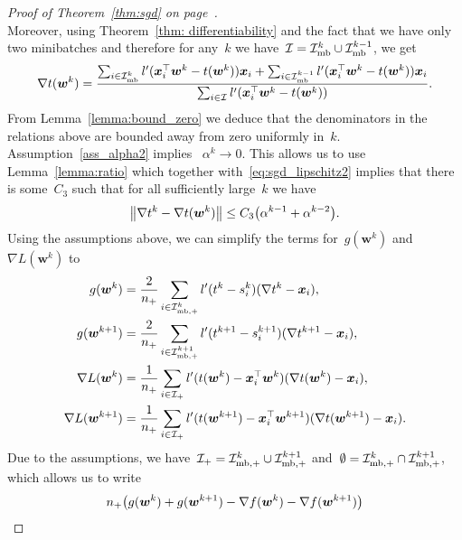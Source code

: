 \begin{proof}[Proof of Theorem~\ref{thm:sgd} on page~\pageref{thm:sgd}]
\begin{equation*}
  \end{equation*}
  Moreover, using Theorem~\ref{thm: differentiability} and the fact that we have only two minibatches and therefore for any~$k$ we have~$\mathcal{I} = \mathcal{I}_{\text{mb}}^k \cup \mathcal{I}_{\text{mb}}^{k-1}$, we get
  \begin{equation*}
    \nabla t(\bm{w}^k)
      = \frac{\sum_{i \in \mathcal{I}_{\text{mb}}^k} l'(\bm{x}_i^\top \bm{w}^k - t(\bm{w}^k))\bm{x}_i + \sum_{i \in \mathcal{I}_{\text{mb}}^{k-1}} l'(\bm{x}_i^\top \bm{w}^k - t(\bm{w}^k))\bm{x}_i}{\sum_{i \in \mathcal{I}} l'(\bm{x}_i^\top \bm{w}^k - t(\bm{w}^k))}.
  \end{equation*}
  From Lemma~\ref{lemma:bound_zero} we deduce that the denominators in the relations above are bounded away from zero uniformly in~$k$. Assumption~\ref{ass_alpha2} implies ~$\alpha^k \to 0$. This allows us to use Lemma~\ref{lemma:ratio} which together with~\eqref{eq:sgd_lipschitz2} implies that there is some~$C_3$ such that for all sufficiently large~$k$ we have
  \begin{equation}\label{eq:sgd_nablat_diff}
    \norm{\nabla t^k - \nabla t(\bm{w}^k)} \leq C_3\Brac{\alpha^{k-1} + \alpha^{k-2}}.
  \end{equation}
  Using the assumptions above, we can simplify the terms for~$g(\bm{w}^k)$ and~$\nabla L(\bm{w}^k)$ to
  \begin{equation*}
    \begin{aligned}
      g(\bm{w}^k)
        & = \frac{2}{n_{+}} \sum_{i \in \mathcal{I}_{\text{mb},+}^k} l'(t^k - s_i^k)(\nabla t^k - \bm{x}_i), \\
      g(\bm{w}^{k+1})
        & = \frac{2}{n_{+}} \sum_{i \in \mathcal{I}_{\text{mb},+}^{k+1}} l'(t^{k+1}-s_i^{k+1})(\nabla t^{k+1} - \bm{x}_i), \\
      \nabla L(\bm{w}^k)
        & = \frac{1}{n_{+}} \sum_{i \in \mathcal{I}_{+}} l'(t(\bm{w}^k) - \bm{x}_i^\top \bm{w}^k)(\nabla t(\bm{w}^k) - \bm{x}_i), \\
      \nabla L(\bm{w}^{k+1})
        & = \frac{1}{n_{+}} \sum_{i \in \mathcal{I}_{+}} l'(t(\bm{w}^{k+1}) - \bm{x}_i^\top \bm{w}^{k+1})(\nabla t(\bm{w}^{k+1}) - \bm{x}_i).
    \end{aligned}
  \end{equation*}
  Due to the assumptions, we have~$\mathcal{I}_{+} = \mathcal{I}_{\text{mb},+}^k \cup \mathcal{I}_{\text{mb},+}^{k+1}$ and~$\emptyset = \mathcal{I}_{\text{mb},+}^k \cap \mathcal{I}_{\text{mb},+}^{k+1}$, which allows us to write
  \begin{subequations}\label{eq:sgd_sum}
    \begin{align}
    \label{eq:sgd_sum1}
    \npos & \Brac{g(\bm{w}^k) + g(\bm{w}^{k+1}) - \nabla f(\bm{w}^k)-\nabla f(\bm{w}^{k+1})}\\

\end{align}
\end{subequations}
\end{proof}
